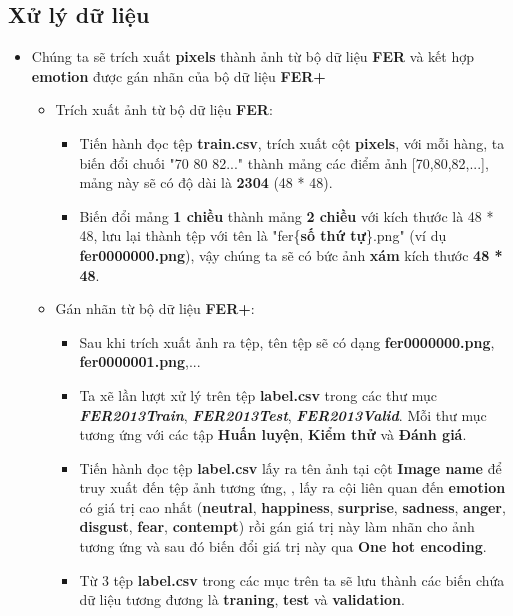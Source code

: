 \documentclass{article}
\begin{document}
\subsection{Xử lý dữ liệu}
\begin{itemize}
   \item Chúng ta sẽ trích xuất \textbf{pixels} thành ảnh từ bộ dữ liệu \textbf{FER} 
   và kết hợp \textbf{emotion} được gán nhãn của bộ dữ liệu \textbf{FER+}
   \begin{itemize}
      \item Trích xuất ảnh từ bộ dữ liệu \textbf{FER}:
      \begin{itemize}
         \item Tiến hành đọc tệp \textbf{train.csv}, 
         trích xuất cột \textbf{pixels}, 
         với mỗi hàng, 
         ta biến đổi chuối "70 80 82..." thành mảng các điểm ảnh [70,80,82,...],
         mảng này sẽ có độ dài là \textbf{2304} (48 * 48).
         \item Biến đổi mảng \textbf{1 chiều} thành mảng \textbf{2 chiều} với kích thước là 48 * 48, 
         lưu lại thành tệp với tên là "fer\{\textbf{số thứ tự}\}.png" (ví dụ \textbf{fer0000000.png}), 
         vậy chúng ta sẽ có bức ảnh \textbf{xám} kích thước \textbf{48 * 48}.
      \end{itemize}
      
      \item Gán nhãn từ bộ dữ liệu \textbf{FER+}: 
      \begin{itemize}
         \item Sau khi trích xuất ảnh ra tệp, tên tệp sẽ có dạng \textbf{fer0000000.png}, \textbf{fer0000001.png},...
         \item Ta xẽ lần lượt xử lý trên tệp \textbf{label.csv} trong các thư mục \textbf{\textit{FER2013Train}}, \textbf{\textit{FER2013Test}}, \textbf{\textit{FER2013Valid}}. 
         Mỗi thư mục tương ứng với các tập \textbf{Huấn luyện}, \textbf{Kiểm thử} và \textbf{Đánh giá}. 
         \item Tiến hành đọc tệp \textbf{label.csv} lấy ra tên ảnh tại cột \textbf{Image name} để truy xuất đến tệp ảnh tương ứng,
         , lấy ra cội liên quan đến \textbf{emotion} có giá trị cao nhất 
         (\textbf{neutral},
         \textbf{happiness},
         \textbf{surprise},
         \textbf{sadness},
         \textbf{anger},
         \textbf{disgust},
         \textbf{fear},
         \textbf{contempt}) rồi gán giá trị này làm nhãn cho ảnh tương ứng và sau đó biến đổi giá trị này qua \textbf{One hot encoding}.
         \item Từ 3 tệp \textbf{label.csv} trong các mục trên ta sẽ lưu thành các biến chứa dữ liệu tương đương là
         \textbf{traning}, \textbf{test} và \textbf{validation}.

      \end{itemize}
      
      
      

   \end{itemize}
\end{itemize}
\end{document}
